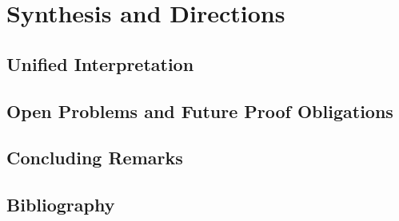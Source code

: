 \documentclass[11pt,oneside]{book}
\begin{document}

\part{Synthesis and Directions}

\chapter{Unified Interpretation}


\chapter{Open Problems and Future Proof Obligations}


\chapter{Concluding Remarks}


\backmatter

\chapter*{Bibliography}



\end{document}
